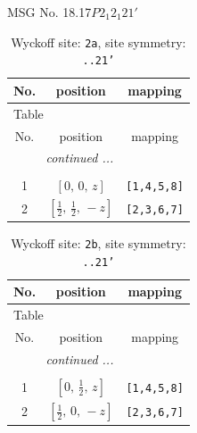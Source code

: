 \documentclass[fleqn,8pt]{jsarticle}
\begin{document}
\setcounter{MaxMatrixCols}{32}

\renewcommand{\tablename}{Table~}
\renewcommand{\figurename}{Figure~}
\begin{center}
\LARGE
MSG No. 18.17\quad$P2_{1}2_{1}21'$
\end{center}
\renewcommand{\arraystretch}{1.2}
\begin{longtable}{ccc}
\caption{Wyckoff site: {\tt 2a}, site symmetry: {\tt ..21'}}
 \\
 \hline \hline
No. & position & mapping \\ \hline \endfirsthead

\multicolumn{2}{l}{\tablename\ \thetable{}} \\
 \hline \hline
No. & position & mapping \\ \hline \endhead

 \hline \hline
\multicolumn{2}{r}{\footnotesize\it continued ...} \\ \endfoot

 \hline \hline
\multicolumn{2}{r}{} \\ \endlastfoot

1 & $\left[ 0,\, 0,\, z \right]$ & {\tt [1,4,5,8]} \\ \hline
2 & $\left[ \frac{1}{2},\, \frac{1}{2},\, - z \right]$ & {\tt [2,3,6,7]} \\
\end{longtable}
\renewcommand{\arraystretch}{1.2}
\begin{longtable}{ccc}
\caption{Wyckoff site: {\tt 2b}, site symmetry: {\tt ..21'}}
 \\
 \hline \hline
No. & position & mapping \\ \hline \endfirsthead

\multicolumn{2}{l}{\tablename\ \thetable{}} \\
 \hline \hline
No. & position & mapping \\ \hline \endhead

 \hline \hline
\multicolumn{2}{r}{\footnotesize\it continued ...} \\ \endfoot

 \hline \hline
\multicolumn{2}{r}{} \\ \endlastfoot

1 & $\left[ 0,\, \frac{1}{2},\, z \right]$ & {\tt [1,4,5,8]} \\ \hline
2 & $\left[ \frac{1}{2},\, 0,\, - z \right]$ & {\tt [2,3,6,7]} \\
\end{longtable}
\end{document}
